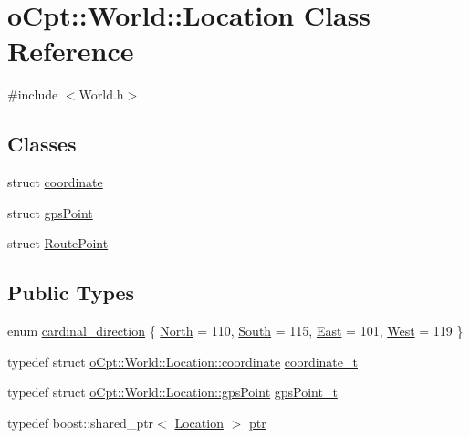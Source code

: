 \hypertarget{classo_cpt_1_1_world_1_1_location}{}\section{o\+Cpt\+:\+:World\+:\+:Location Class Reference}
\label{classo_cpt_1_1_world_1_1_location}


{\ttfamily \#include $<$World.\+h$>$}

\subsection*{Classes}
\begin{DoxyCompactItemize}
\item 
struct \hyperlink{structo_cpt_1_1_world_1_1_location_1_1coordinate}{coordinate}
\item 
struct \hyperlink{structo_cpt_1_1_world_1_1_location_1_1gps_point}{gps\+Point}
\item 
struct \hyperlink{structo_cpt_1_1_world_1_1_location_1_1_route_point}{Route\+Point}
\end{DoxyCompactItemize}
\subsection*{Public Types}
\begin{DoxyCompactItemize}
\item 
enum \hyperlink{classo_cpt_1_1_world_1_1_location_aa37d99a87b49ccc38470dcc6cc64ced5}{cardinal\+\_\+direction} \{ \hyperlink{classo_cpt_1_1_world_1_1_location_aa37d99a87b49ccc38470dcc6cc64ced5ac706574c1e2fcd94ec86cc17851b848b}{North} = 110, 
\hyperlink{classo_cpt_1_1_world_1_1_location_aa37d99a87b49ccc38470dcc6cc64ced5a6380581e8856626370ef7e28b88ff8c9}{South} = 115, 
\hyperlink{classo_cpt_1_1_world_1_1_location_aa37d99a87b49ccc38470dcc6cc64ced5a429b1917d3bf9c2f75eb55d30a0a2e20}{East} = 101, 
\hyperlink{classo_cpt_1_1_world_1_1_location_aa37d99a87b49ccc38470dcc6cc64ced5a362e85ccd8384db96571b670ad2d20a6}{West} = 119
 \}
\item 
typedef struct \hyperlink{structo_cpt_1_1_world_1_1_location_1_1coordinate}{o\+Cpt\+::\+World\+::\+Location\+::coordinate} \hyperlink{classo_cpt_1_1_world_1_1_location_ade9263a17c41b7af085dfcb9055b18f3}{coordinate\+\_\+t}
\item 
typedef struct \hyperlink{structo_cpt_1_1_world_1_1_location_1_1gps_point}{o\+Cpt\+::\+World\+::\+Location\+::gps\+Point} \hyperlink{classo_cpt_1_1_world_1_1_location_a3aa5e31e2888b4da40ad534b99473888}{gps\+Point\+\_\+t}
\item 
typedef boost\+::shared\+\_\+ptr$<$ \hyperlink{classo_cpt_1_1_world_1_1_location}{Location} $>$ \hyperlink{classo_cpt_1_1_world_1_1_location_a33b7d6b8797958b6e4d792dfeaa6d160}{ptr}
\end{DoxyCompactItemize}
